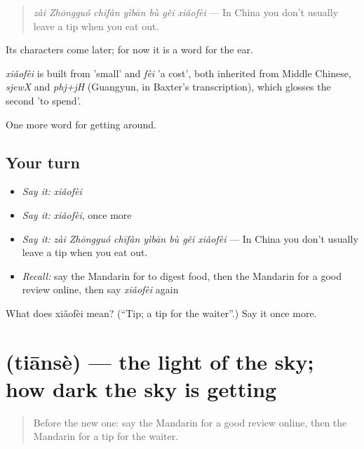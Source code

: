 \begin{quote}
\emph{zài Zhōngguó chīfàn yìbān bù gěi xiǎofèi} — In China you don't usually leave a tip when you eat out.
\end{quote}

Its characters come later; for now it is a word for the ear.

\begin{cousinweb}
\emph{xiǎofèi} is built from  'small' and \emph{fèi} 'a cost', both inherited from Middle Chinese, \emph{sjewX} and \emph{phj+jH} (Guangyun, in Baxter's transcription), which glosses the second 'to spend'.
\end{cousinweb}

\begin{grammarlens}[title={What you've built}]
One more word for getting around.
\end{grammarlens}

\subsection*{Your turn}
\begin{itemize}
\raggedright
  \item \emph{Say it:} \emph{xiǎofèi}
  \item \emph{Say it:} \emph{xiǎofèi}, once more
  \item \emph{Say it:} \emph{zài Zhōngguó chīfàn yìbān bù gěi xiǎofèi} — In China you don't usually leave a tip when you eat out.
  \item \emph{Recall:} say the Mandarin for to digest food, then the Mandarin for a good review online, then say \emph{xiǎofèi} again
\end{itemize}

\begin{tcolorbox}[breakable,colback=teal!4,colframe=teal!35!black,title={Before you move on}]
What does xiǎofèi mean? (\textquotedblleft{}Tip; a tip for the waiter\textquotedblright{}.) Say it once more.
\end{tcolorbox}
\section[\texorpdfstring{\zh{天色} (tiānsè)}{天色 (tiānsè)}]{ (tiānsè) — the light of the sky; how dark the sky is getting}

\label{lesson:ZH-C452-tianse}



\begin{quote}
Before the new one: say the Mandarin for a good review online, then the Mandarin for a tip for the waiter.
\end{quote}

